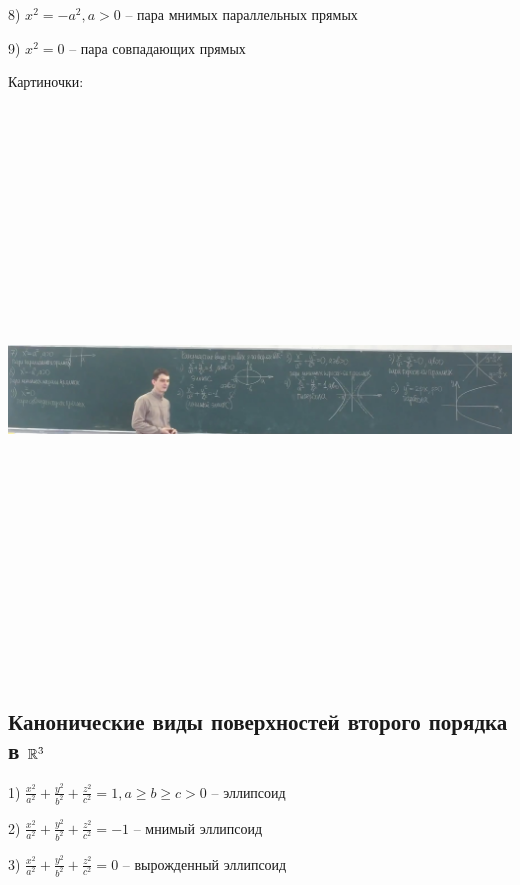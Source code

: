\vspace{\baselineskip}
8) $x^2 = -a^2, a > 0$ -- пара мнимых параллельных прямых

\vspace{\baselineskip}
9) $x^2 = 0$ -- пара совпадающих прямых

\vspace{\baselineskip}
Картиночки:

\includegraphics[width=19cm,height=15cm,keepaspectratio]{example2.jpg}

\subsection{Канонические виды поверхностей второго порядка в $\mathbb{R}^3$}

1) $\frac{x^2}{a^2} + \frac{y^2}{b^2} + \frac{z^2}{c^2} = 1, a \geqslant b \geqslant c > 0$ -- эллипсоид

\vspace{\baselineskip}
2) $\frac{x^2}{a^2} + \frac{y^2}{b^2} + \frac{z^2}{c^2} = -1$ -- мнимый эллипсоид

\vspace{\baselineskip}
3) $\frac{x^2}{a^2} + \frac{y^2}{b^2} + \frac{z^2}{c^2} = 0$ -- вырожденный эллипсоид

